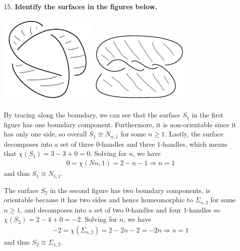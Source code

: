 \documentclass[a4paper,12pt]{article}
\begin{document}
\begin{enumerate}
    \item[15.]
        \boldmath\textbf{Identify the surfaces in the figures below.
        }\unboldmath \par
        \begin{center}
            \includegraphics[scale=0.8]{hw5_fig1}
            \qquad \qquad
            \includegraphics[scale=0.8]{hw5_fig2}
        \end{center}
        By tracing along the boundary, we can see that the surface $S_1$ in the first figure has one boundary component. Furthermore, it is non-orientable since it has only one side, so overall $S_1 \cong N_{n, 1}$ for some $n \geq 1$. Lastly, the surface decomposes into a set of three $0$-handles and three $1$-handles, which means that $\chi(S_1) = 3 - 3 + 0 = 0$. Solving for $n$, we have
        \begin{align*}
            0 = \chi(N{n, 1}) = 2 - n - 1 \Rightarrow n = 1
        \end{align*}
        and thus $S_1 \cong N_{1, 1}$. \par
        The surface $S_2$ in the second figure has two boundary components, is orientable because it has two sides and hence homeomorphic to $\Sigma_{n, 2}$ for some $n \geq 1$, and decomposes into a set of two $0$-handles and four $1$-handles so $\chi(S_2) = 2 - 4 + 0 = -2$. Solving for $n$, we have
        \begin{align*}
            -2 = \chi(\Sigma_{n, 2}) = 2 - 2n - 2 = -2n \Rightarrow n = 1
        \end{align*}
        and thus $S_2 \cong \Sigma_{1, 2}$.
\end{enumerate}
\end{document}
